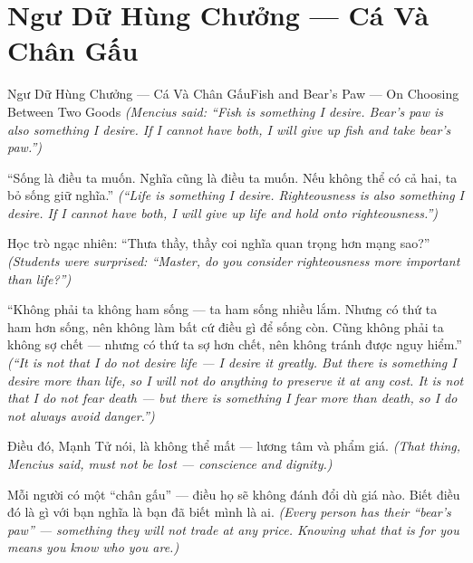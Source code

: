 \section{Ngư Dữ Hùng Chưởng — Cá Và Chân Gấu}
\begin{truyen}{Ngư Dữ Hùng Chưởng — Cá Và Chân Gấu}{Fish and Bear's Paw — On Choosing Between Two Goods}
\textit{(Mencius said: ``Fish is something I desire. Bear's paw is also something I desire. If I cannot have both, I will give up fish and take bear's paw.'')}

``Sống là điều ta muốn. Nghĩa cũng là điều ta muốn. Nếu không thể có cả hai, ta bỏ sống giữ nghĩa.''
\textit{(``Life is something I desire. Righteousness is also something I desire. If I cannot have both, I will give up life and hold onto righteousness.'')}

Học trò ngạc nhiên: ``Thưa thầy, thầy coi nghĩa quan trọng hơn mạng sao?''
\textit{(Students were surprised: ``Master, do you consider righteousness more important than life?'')}

``Không phải ta không ham sống — ta ham sống nhiều lắm. Nhưng có thứ ta ham hơn sống, nên không làm bất cứ điều gì để sống còn. Cũng không phải ta không sợ chết — nhưng có thứ ta sợ hơn chết, nên không tránh được nguy hiểm.''
\textit{(``It is not that I do not desire life — I desire it greatly. But there is something I desire more than life, so I will not do anything to preserve it at any cost. It is not that I do not fear death — but there is something I fear more than death, so I do not always avoid danger.'')}

Điều đó, Mạnh Tử nói, là không thể mất — lương tâm và phẩm giá.
\textit{(That thing, Mencius said, must not be lost — conscience and dignity.)}

\end{truyen}

\begin{baihoc}
Mỗi người có một ``chân gấu'' — điều họ sẽ không đánh đổi dù giá nào. Biết điều đó là gì với bạn nghĩa là bạn đã biết mình là ai.
\textit{(Every person has their ``bear's paw'' — something they will not trade at any price. Knowing what that is for you means you know who you are.)}
\end{baihoc}
\ngancach

